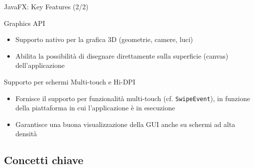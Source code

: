 \documentclass[xcolor=dvipsnames,presentation]{beamer}
\begin{document}
\begin{frame}{JavaFX: Key Features (2/2)}
\begin{block}{Graphics API}
\begin{itemize}
\item Supporto nativo per la grafica 3D (geometrie, camere, luci)
\item Abilita la possibilità di disegnare direttamente sulla superficie (canvas) dell'applicazione
\end{itemize}
\end{block}
%
\begin{block}{Supporto per schermi Multi-touch e Hi-DPI}
\begin{itemize}
\item Fornisce il supporto per funzionalità  multi-touch (cf. \texttt{SwipeEvent}), in funzione della piattaforma in cui l'applicazione è in esecuzione
\item Garantisce una buona visualizzazione della GUI anche su schermi ad alta densità
\end{itemize}
\end{block}
\end{frame}


\subsection{Concetti chiave}
\end{document}

